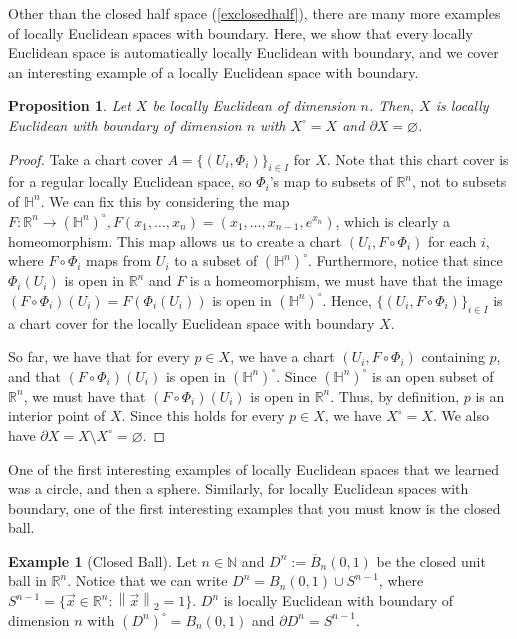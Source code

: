 \documentclass{article}
\newcommand{\N}{\mathbb{N}}
\newcommand{\R}{\mathbb{R}}
\renewcommand{\H}{\mathbb{H}}
\newcommand{\cl}[1]{\overline{#1}}
\newcommand{\bdr}{\partial}
\newcommand{\norm}[1]{\left\|#1\right\|}
\theoremstyle{plain} %
\numberwithin{thm}{section} %
\newtheorem{prop}[thm]{Proposition}
\theoremstyle{definition} %
\newtheorem{example}[thm]{Example}
\begin{document}
Other than the closed half space (\ref{exclosedhalf}), there are many more examples of locally Euclidean spaces with boundary. Here, we show that every locally Euclidean space is automatically locally Euclidean with boundary, and we cover an interesting example of a locally Euclidean space with boundary.

\begin{prop}
    \label{letolewb}
    Let $X$ be locally Euclidean of dimension $n$. Then, $X$ is locally Euclidean with boundary of dimension $n$ with $X^\circ = X$ and $\bdr X = \varnothing$.
\end{prop}

\begin{proof}
Take a chart cover $A = \{(U_i, \Phi_i)\}_{i \in I}$ for $X$. Note that this chart cover is for a regular locally Euclidean space, so $\Phi_i$'s map to subsets of $\R^n$, not to subsets of $\H^n$. We can fix this by considering the map $F: \R^n \to (\H^n)^\circ, F(x_1, \dots, x_n) = (x_1, \dots, x_{n - 1}, e^{x_n})$, which is clearly a homeomorphism. This map allows us to create a chart $(U_i, F \circ \Phi_i)$ for each $i$, where $F \circ \Phi_i$ maps from $U_i$ to a subset of $(\H^n)^\circ$. Furthermore, notice that since $\Phi_i(U_i)$ is open in $\R^n$ and $F$ is a homeomorphism, we must have that the image $(F \circ \Phi_i)(U_i) = F(\Phi_i(U_i))$ is open in $(\H^n)^\circ$. Hence, $\{(U_i, F \circ \Phi_i)\}_{i \in I}$ is a chart cover for the locally Euclidean space with boundary $X$.

So far, we have that for every $p \in X$, we have a chart $(U_i, F \circ \Phi_i)$ containing $p$, and that $(F \circ \Phi_i)(U_i)$ is open in $(\H^n)^\circ$. Since $(\H^n)^\circ$ is an open subset of $\R^n$, we must have that $(F \circ \Phi_i)(U_i)$ is open in $\R^n$. Thus, by definition, $p$ is an interior point of $X$. Since this holds for every $p \in X$, we have $X^\circ = X$. We also have $\bdr X = X \setminus X^\circ = \varnothing$.
\end{proof}

One of the first interesting examples of locally Euclidean spaces that we learned was a circle, and then a sphere. Similarly, for locally Euclidean spaces with boundary, one of the first interesting examples that you must know is the closed ball.

\begin{example}[Closed Ball]
    \label{clball}
    Let $n \in \N$ and $D^n := \cl{B}_n(0, 1)$ be the closed unit ball in $\R^n$. Notice that we can write $D^n = B_n(0, 1) \cup S^{n - 1}$, where $S^{n - 1} = \{\vec{x} \in \R^n: \norm{\vec{x}}_2 = 1\}$. $D^n$ is locally Euclidean with boundary of dimension $n$ with $(D^n)^\circ = B_n(0, 1)$ and $\bdr D^n = S^{n - 1}$.
\end{example}
\end{document}
